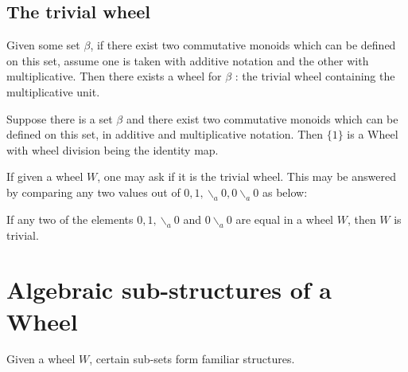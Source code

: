 \subsection{The trivial wheel}
Given some set $\beta$, if there exist two commutative monoids which can be defined on this set, assume one is taken
with additive notation and the other with multiplicative. Then there exists 
a wheel for $\beta$ : the trivial wheel containing the multiplicative unit.
\begin{proposition}
  \leanok
  Suppose there is a set $\beta$ and there exist two commutative monoids which can be defined on this set, in additive
  and multiplicative notation. Then $\{ 1 \}$ is a Wheel with wheel division being the identity map.
\end{proposition}
If given a wheel $W$, one may ask if it is the trivial wheel. This may be answered by comparing any two values out of
$0,1,\backslash_{a} 0, 0 \backslash_{a} 0$ as below:
\begin{proposition}
\leanok
  If any two of the elements $0,1,\backslash_{a} 0$ and $0 \backslash_{a} 0$ are equal in a
wheel $W$, then $W$ is trivial.
\end{proposition} 
\section{Algebraic sub-structures of a Wheel} 
Given a wheel $W$, certain sub-sets form familiar structures. 
